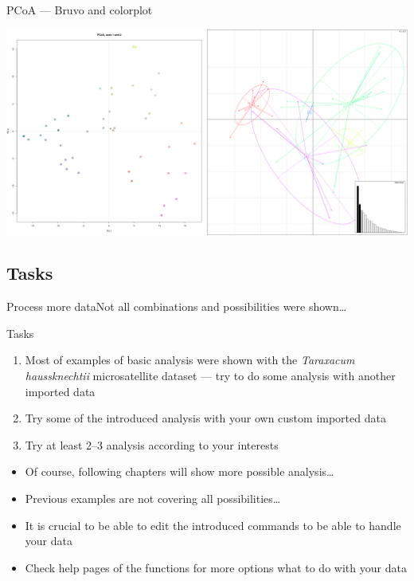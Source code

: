 \documentclass[compress, ucs, xelatex, 11pt, xcolor=svgnames, aspectratio=169,
	hyperref={
		bookmarks=true,
		unicode=true,
		colorlinks=true,
		pdftitle={Molecular data in R},
		plainpages=false,
		pdfauthor={Vojtech Zeisek},
		pdfsubject={Course about phylogeny and evolution in R},
		pdfcreator={XeLaTeX},
		pdfkeywords={R, evolution, phylogeny, molecular data},
		linkcolor=Crimson, %
		anchorcolor=Magenta, %
		citecolor=Magenta, %
		filecolor=Magenta, %
		menucolor=Magenta, %
		urlcolor=DodgerBlue, %
		pdftex},
	url={hyphens, lowtilde} %
	]{beamer}
\begin{document}
\begin{frame}{PCoA --- Bruvo and colorplot}
	\begin{center}
		\includegraphics[width=\textwidth-2cm]{pcoa-dalsi.png}
	\end{center}
\end{frame}

\subsection{Tasks}

\begin{frame}{Process more data}{Not all combinations and possibilities were shown\ldots}
	\begin{exampleblock}{Tasks}
		\begin{enumerate}
			\item Most of examples of basic analysis were shown with the \textit{Taraxacum haussknechtii} microsatellite dataset --- try to do some analysis with another imported data
			\item Try some of the introduced analysis with your own custom imported data
			\item Try at least 2--3 analysis according to your interests
		\end{enumerate}
	\end{exampleblock}
	\begin{itemize}
		\item Of course, following chapters will show more possible analysis\ldots
		\item Previous examples are not covering all possibilities\ldots
		\item It is crucial to be able to edit the introduced commands to be able to handle your data
		\item Check help pages of the functions for more options what to do with your data
	\end{itemize}
\end{frame}
\end{document}
